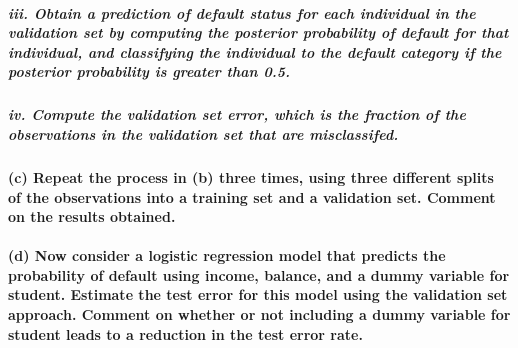 \documentclass[
]{article}
\begin{document}
\subparagraph{iii. Obtain a prediction of default status for each
individual in the validation set by computing the posterior probability
of default for that individual, and classifying the individual to the
default category if the posterior probability is greater than
0.5.}\label{iii.-obtain-a-prediction-of-default-status-for-each-individual-in-the-validation-set-by-computing-the-posterior-probability-of-default-for-that-individual-and-classifying-the-individual-to-the-default-category-if-the-posterior-probability-is-greater-than-0.5.}

\subparagraph{iv. Compute the validation set error, which is the
fraction of the observations in the validation set that are
misclassifed.}\label{iv.-compute-the-validation-set-error-which-is-the-fraction-of-the-observations-in-the-validation-set-that-are-misclassifed.}

\paragraph{(c) Repeat the process in (b) three times, using three
different splits of the observations into a training set and a
validation set. Comment on the results
obtained.}\label{c-repeat-the-process-in-b-three-times-using-three-different-splits-of-the-observations-into-a-training-set-and-a-validation-set.-comment-on-the-results-obtained.}

\paragraph{(d) Now consider a logistic regression model that predicts
the probability of default using income, balance, and a dummy variable
for student. Estimate the test error for this model using the validation
set approach. Comment on whether or not including a dummy variable for
student leads to a reduction in the test error
rate.}\label{d-now-consider-a-logistic-regression-model-that-predicts-the-probability-of-default-using-income-balance-and-a-dummy-variable-for-student.-estimate-the-test-error-for-this-model-using-the-validation-set-approach.-comment-on-whether-or-not-including-a-dummy-variable-for-student-leads-to-a-reduction-in-the-test-error-rate.}
\end{document}
